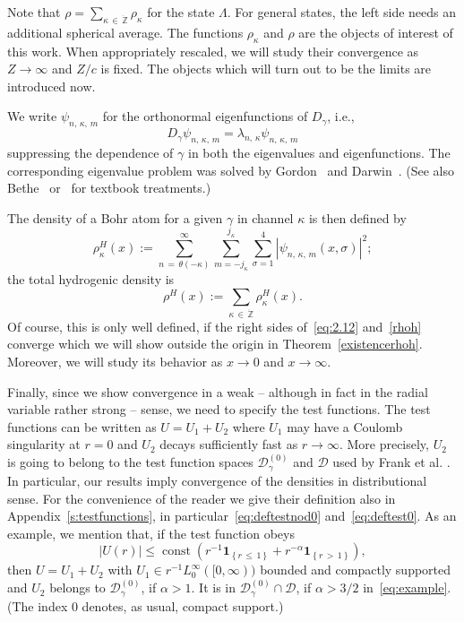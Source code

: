 \documentclass[10pt]{amsart}
\theoremstyle{definition}
\DeclareMathOperator{\const}{const}
\newcommand*\gz{\mathbb{Z}}
\newcommand*\zp{\dot{\gz}}
\newcommand{\one}{\mathbf{1}}
\newcommand*\cD{\mathcal{D}}
\begin{document}
Note that $\rho=\sum_{\kappa\,\in\,\zp}\rho_\kappa$ for the state $\Lambda$. For general states, the left side needs an additional spherical average. The functions $\rho_\kappa$ and $\rho$ are the objects of interest of this work. When appropriately rescaled, we will study their convergence as $Z\to\infty$ and $Z/c$ is fixed. The objects which will turn out to be the limits are introduced now.

We write $\psi_{n,\,\kappa,\,m}$ for the orthonormal eigenfunctions of $D_\gamma$, i.e.,
\begin{equation}\label{eigenfunktion}
D_\gamma\psi_{n,\,\kappa,\,m}=\lambda_{n,\,\kappa}\psi_{n,\,\kappa,\,m}
\end{equation}
suppressing the dependence of $\gamma$ in both the eigenvalues and eigenfunctions. The corresponding eigenvalue problem was solved by Gordon~\cite{Gordon1928} and Darwin~\cite{Darwin1928}. (See also Bethe~\cite[Formula~(9.29)]{Bethe1933} or~\cite[Formula~(7.140)]{Thaller1992} for textbook treatments.)

The density of a Bohr atom for a given $\gamma$ in channel $\kappa$ is then defined by
\begin{equation}\label{eq:2.12}
\rho_{\kappa}^H(x) := \sum_{n\,=\,\theta(-\kappa)}^\infty\sum_{m=-j_\kappa}^{j_\kappa}
\sum_{\sigma=1}^4\left|\psi_{n,\,\kappa,\,m}(x,\sigma)\right|^2;
\end{equation}
the total hydrogenic density is
\begin{equation}\label{rhoh}
\rho^H(x) := \sum_{\kappa\,\in\,\zp}\rho_\kappa^H(x).
\end{equation}
Of course, this is only well defined, if the right sides of~\eqref{eq:2.12} and~\eqref{rhoh} converge which we will show outside the origin in Theorem~\ref{existencerhoh}. Moreover, we will study its behavior as $x\to0$ and $x\to\infty$.

Finally, since we show convergence in a weak -- although in fact in the radial variable rather strong -- sense, we need to specify the test functions. The test functions can be written as $U=U_1+U_2$ where $U_1$ may have a Coulomb singularity at $r=0$ and $U_2$ decays sufficiently fast as $r\to\infty$. More precisely, $U_2$ is going to belong to the test function spaces $\cD_\gamma^{(0)}$ and $\cD$ used by Frank et al. \cite{Franketal2020P}. In particular, our results imply convergence of the densities in distributional sense. For the convenience of the reader we give their definition also in Appendix~\ref{s:testfunctions}, in particular~\eqref{eq:deftestnod0} and~\eqref{eq:deftest0}. As an example, we mention that, if the test function obeys
\begin{equation}\label{eq:example}
|U(r)| \leq \const \left(r^{-1}\one_{\left\{r\,\leq\,1\right\}} + r^{-\alpha}\one_{\left\{r\,>\,1\right\}}\right),
\end{equation}
then $U=U_1+U_2$ with $U_1\in r^{-1}L^\infty_0 ([0,\infty))$ bounded and compactly supported and $U_2$ belongs to $\cD_\gamma^{(0)}$, if $\alpha>1$. It is in $\cD_\gamma^{(0)}\cap\cD$, if $\alpha>3/2$ in~\eqref{eq:example}. (The index $0$ denotes, as usual, compact support.)
\end{document}
